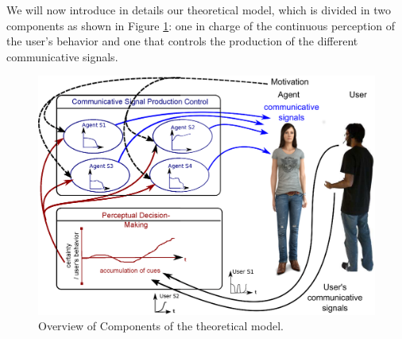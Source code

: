 We will now introduce in details our theoretical model, which is divided in two components as shown in Figure \ref{fig:mod-comp}: one in charge of the continuous perception of the user's behavior and one that controls the production of the different communicative signals. 

\begin{figure}
  \includegraphics[width=\linewidth]{figure/modele_conceptuel_act.eps}
  \caption{Overview of Components of the theoretical model.}
  \label{fig:mod-comp}
\end{figure}



